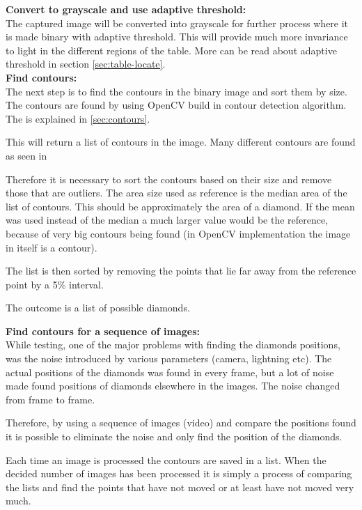 
\textbf{Convert to grayscale and use adaptive threshold:}\\
The captured image will be converted into grayscale for further process where it is made binary with adaptive threshold. This will provide much more invariance to light in the different regions of the table. More can be read about adaptive threshold in section \ref{sec:table-locate}.\\

\textbf{Find contours:}\\
The next step is to find the contours in the binary image and sort them by size. The contours are found by using OpenCV build in contour detection algorithm. The is explained in \ref{sec:contours}.

This will return a list of contours in the image. Many different contours are found as seen in %

Therefore it is necessary to sort the contours based on their size and remove those that are outliers. The area size used as reference is the median area of the list of contours. This should be approximately the area of a diamond. If the mean was used instead of the median a much larger value would be the reference, because of very big contours being found (in OpenCV implementation the image in itself is a contour).


The list is then sorted by removing the points that lie far away from the reference point by a 5\% interval. 

The outcome is a list of possible diamonds.

\textbf{Find contours for a sequence of images:}\\
While testing, one of the major problems with finding the diamonds positions, was the noise introduced by various parameters (camera, lightning etc). The actual positions of the diamonds was found in every frame, but a lot of noise made found positions of diamonds elsewhere in the images. 
The noise changed from frame to frame.

Therefore, by using a sequence of images (video) and compare the positions found it is possible to eliminate the noise and only find the position of the diamonds.

Each time an image is processed the contours are saved in a list. When the decided number of images has been processed it is simply a process of comparing the lists and find the points that have not moved or at least have not moved very much.\\

